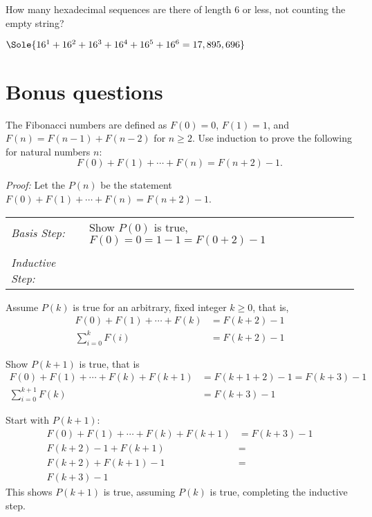 \begin{questions}
 How many hexadecimal sequences are there of length 6 or less, not counting the empty string?
    \ifprintanswers
        \vspace{-15pt}
   \fi
    \begin{solution}
    $\Sole{ 16^1 + 16^2 + 16^3 + 16^4 + 16^5 + 16^6 = 17,895,696 }$
    \end{solution}


\section*{Bonus questions}

\bonusquestion[4] The Fibonacci numbers are defined as $F(0) = 0$, $F(1) = 1$, and $F(n) = F(n-1) + F(n-2)$ for $n \geq 2$.   Use induction to prove the following for natural numbers $n$:
\[ F(0) + F(1) + \cdots + F(n) = F(n+2) - 1.  \]
    \ifprintanswers
        \vspace{-10pt}
   \fi
\begin{solution}
  \textit{Proof:}
  Let the $P(n)$ be the statement $F(0) + F(1) + \cdots + F(n) = F(n+2) -1$.

  \smallskip
  \begin{tabular}{lp{4in}}
    \textit{Basis Step:} & Show $P(0)$ is true, $F(0) = 0 = 1 - 1 = F(0+2) - 1$ \\
     & \\
   \textit{Inductive Step:} &  \\
  \end{tabular}

  Assume $P(k)$ is true for an arbitrary, fixed integer $k \geq 0$, that is,
  \begin{align*}
    F(0) + F(1) + \cdots + F(k) &= F(k+2) - 1  \tag{IH} \\
    \sum_{i=0}^k F(i) &= F(k+2) - 1
  \end{align*}

  Show $P(k+1)$ is true, that is
  \begin{align*}
    F(0) + F(1) + \cdots + F(k) + F(k+1) &= F(k+1+2) - 1 = F(k+3) - 1 \\
    \sum_{i=0}^{k+1} F(k) &= F(k+3) - 1
  \end{align*}

  Start with $P(k+1)$:
  \begin{align*}
    F(0) + F(1) + \cdots + F(k) + F(k+1) &= F(k+3) - 1  \\
    F(k+2) - 1 + F(k+1) &= \tag{IH} \\
    F(k+2) + F(k+1) - 1 &= \\
    F(k+3) - 1
  \end{align*}
  This shows $P(k+1)$ is true, assuming $P(k)$ is true, completing the inductive step. 


\end{solution}
\end{questions}
